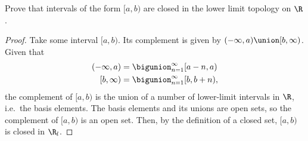 \documentclass[twocolumn, noxcolor, maketitle]{rbt-mathnotes-hw}
\begin{document}
\begin{problem}[1.32]
  Prove that intervals of the form $[a, b)$ are closed in the lower limit
  topology on $\R$.
\end{problem}
\begin{proof}
  Take some interval $[a, b)$. Its complement is given by $(-\infty, a) \union
  [b, \infty)$. Given that
  \begin{alignat*}{1}
    (-\infty, a) &= \bigunion_{n=1}^\infty [a-n, a) \\
    [b, \infty) &= \bigunion_{n=1}^\infty [b, b+n),
  \end{alignat*}
  the complement of $[a, b)$ is the union of a number of lower-limit intervals
  in $\R$, i.e.~the basis elements. The basis elements and its unions are open
  sets, so the complement of $[a, b)$ is an open set. Then, by the definition of
  a closed set, $[a, b)$ is closed in $\R_l$.
\end{proof}
\end{document}
